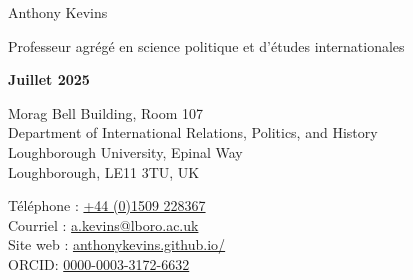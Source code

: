 \documentclass[letterpaper,fontsize=10.5pt]{scrartcl}
\begin{document}


\huge Anthony Kevins\\
\begin{minipage}[t]{.87\linewidth}
	\large Professeur agrégé en science politique et d'études internationales\\
\end{minipage}%
\begin{minipage}[t]{.13\linewidth}
	\raggedleft
	\scriptsize \textbf{Juillet 2025}\\
\end{minipage}%
\normalsize

\hrulefill

\begin{minipage}[p]{.6\linewidth}
	\raggedright
	\medskip
	Morag Bell Building, Room 107\\
	Department of International Relations, Politics, and History\\
	Loughborough University, Epinal Way\\
	Loughborough, LE11 3TU, UK\\
	\medskip
\end{minipage}%
\begin{minipage}[p]{.4\linewidth}
	\raggedleft
	\medskip
	Téléphone : \href{tel:+4401509228367}{+44 (0)1509 228367}\\
	Courriel : \href{mailto:a.kevins@lboro.ac.uk}{a.kevins@lboro.ac.uk}\\
	Site web : \href{https://anthonykevins.github.io/fr/}{anthonykevins.github.io/}\\
	ORCID: \href{https://orcid.org/0000-0003-3172-6632}{0000-0003-3172-6632}\\
	\medskip
\end{minipage}%

\hrulefill

\end{document}
